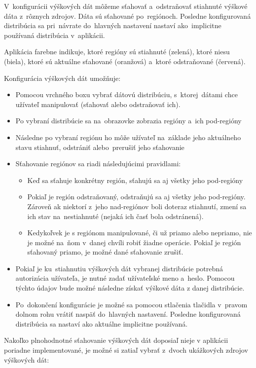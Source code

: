 \documentclass[12pt,a4paper]{report}
\begin{document}
V~konfigurácii výškových dát môžeme sťahovať a~odstraňovať stiahnuté výškové dáta z~rôznych zdrojov. Dáta sú sťahované po~regiónoch. Posledne konfigurovaná distribúcia sa pri~návrate do~hlavných nastavení nastaví ako~implicitne používaná distribúcia v~aplikácii.

Aplikácia farebne indikuje, ktoré regióny sú stiahnuté (zelená), ktoré niesu (biela), ktoré sú aktuálne sťahované (oranžová) a~ktoré odstraňované (červená).

Konfigurácia výškových dát umožňuje:
\begin{itemize}
    \item Pomocou vrchného boxu vybrať dátovú distribúciu, s~ktorej~dátami chce užívateľ manipulovať (sťahovať alebo odstraňovať ich).
    \item Po vybraní distribúcie sa na~obrazovke zobrazia regióny a~ich pod-regióny
    \item Následne po vybraní regiónu ho môže užívateľ na~základe jeho aktuálneho stavu stiahnuť, odstrániť alebo~prerušiť jeho sťahovanie
    \item Sťahovanie regiónov sa riadi následujúcimi pravidlami:
    \begin{itemize}
        \item Keď sa sťahuje konkrétny región, sťahujú sa aj všetky jeho pod-regióny
        \item Pokiaľ je región odstraňovaný, odstraňujú sa aj všetky jeho pod-regióny. Zároveň ak niektorí z~jeho nad-regiónov boli doteraz stiahnutí, zmení sa ich stav na~nestiahnuté (nejaká ich časť bola odstránená).
        \item Kedykoľvek je s regiónom manipulované, či už priamo alebo nepriamo, nie je možné na~ňom v~danej chvíli robiť žiadne operácie. Pokiaľ je región sťahovaný priamo, je možné dané sťahovanie zrušiť.
    \end{itemize}
    \item Pokiaľ je ku~stiahnutiu výškových dát vybranej distribúcie potrebná autorizácia užívateľa, je nutné zadať užívateľské meno a~heslo. Pomocou týchto údajov bude možné následne získať výškové dáta z danej distribúcie.
    \item Po~dokončení konfigurácie je možné sa pomocou stlačenia tlačidla v~pravom dolnom rohu vrátiť naspäť do~hlavných nastavení. Posledne konfigurovaná distribúcia sa nastaví ako aktuálne implicitne používaná.
\end{itemize}
Nakoľko plnohodnotné sťahovanie výškových dát doposiaľ nieje v aplikácii poriadne implementované, je možné si zatiaľ vybrať z~dvoch ukážkových zdrojov výškových dát:
\end{document}
